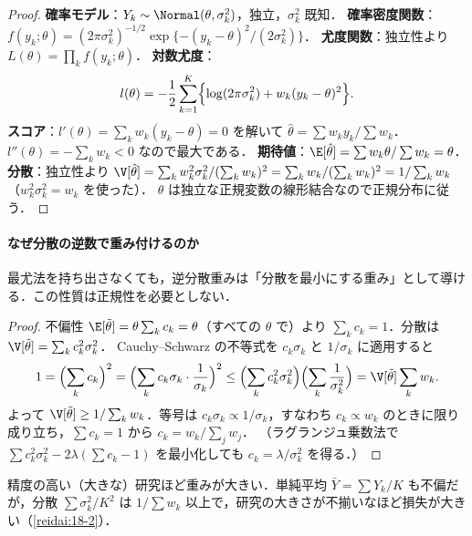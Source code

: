 \begin{proof}
\textbf{確率モデル}：$Y_k\sim\Normal(\theta,\sigma_k^2)$，独立，$\sigma_k^2$ 既知．
\textbf{確率密度関数}：$f(y_k;\theta)=(2\pi\sigma_k^2)^{-1/2}\exp\{-(y_k-\theta)^2/(2\sigma_k^2)\}$．
\textbf{尤度関数}：独立性より $L(\theta)=\prod_kf(y_k;\theta)$．
\textbf{対数尤度}：
\[
l(\theta)=-\frac12\sum_{k=1}^K\Bigl\{\log(2\pi\sigma_k^2)+w_k(y_k-\theta)^2\Bigr\}.
\]
\textbf{スコア}：$l'(\theta)=\sum_kw_k(y_k-\theta)=0$ を解いて $\hat\theta=\sum w_ky_k/\sum w_k$．
$l''(\theta)=-\sum_kw_k<0$ なので最大である．
\textbf{期待値}：$\E[\hat\theta]=\sum w_k\theta/\sum w_k=\theta$．
\textbf{分散}：独立性より $\V[\hat\theta]=\sum_kw_k^2\sigma_k^2/(\sum_kw_k)^2=\sum_kw_k/(\sum_kw_k)^2=1/\sum_kw_k$
（$w_k^2\sigma_k^2=w_k$ を使った）．
$\hat\theta$ は独立な正規変数の線形結合なので正規分布に従う．
\end{proof}

\paragraph{なぜ分散の逆数で重み付けるのか}
最尤法を持ち出さなくても，逆分散重みは「分散を最小にする重み」として導ける．この性質は正規性を必要としない．
\begin{proof}
不偏性 $\E[\tilde\theta]=\theta\sum_kc_k=\theta$（すべての $\theta$ で）より $\sum_kc_k=1$．分散は $\V[\tilde\theta]=\sum_kc_k^2\sigma_k^2$．
Cauchy--Schwarz の不等式を $c_k\sigma_k$ と $1/\sigma_k$ に適用すると
\[
1=\Bigl(\sum_kc_k\Bigr)^2=\Bigl(\sum_k c_k\sigma_k\cdot\frac1{\sigma_k}\Bigr)^2\le\Bigl(\sum_kc_k^2\sigma_k^2\Bigr)\Bigl(\sum_k\frac1{\sigma_k^2}\Bigr)
=\V[\tilde\theta]\sum_kw_k .
\]
よって $\V[\tilde\theta]\ge1/\sum_kw_k$．等号は $c_k\sigma_k\propto1/\sigma_k$，すなわち $c_k\propto w_k$ のときに限り成り立ち，$\sum c_k=1$ から $c_k=w_k/\sum_jw_j$．
（ラグランジュ乗数法で $\sum c_k^2\sigma_k^2-2\lambda(\sum c_k-1)$ を最小化しても $c_k=\lambda/\sigma_k^2$ を得る．）
\end{proof}
精度の高い（大きな）研究ほど重みが大きい．単純平均 $\bar Y=\sum Y_k/K$ も不偏だが，分散 $\sum\sigma_k^2/K^2$ は $1/\sum w_k$ 以上で，研究の大きさが不揃いなほど損失が大きい（\cref{reidai:18-2}）．

